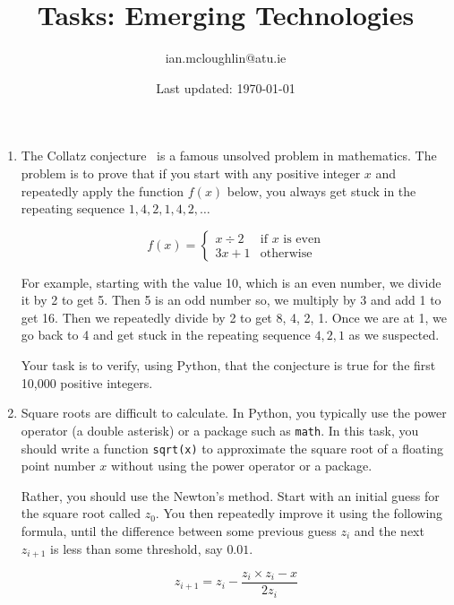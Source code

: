 \documentclass{iansnotes}
\title{Tasks: Emerging Technologies}
\author{ian.mcloughlin@atu.ie}
\date{Last updated: \today}
\begin{document}
 
\maketitle
 
\begin{enumerate}
  \item The Collatz conjecture~\autocite{quantacollatz} is a famous unsolved problem in mathematics. The problem is to prove that if you start with any positive integer $x$ and repeatedly apply the function $f(x)$ below, you always get stuck in the repeating sequence $1,4,2,1,4,2,\ldots$ 
  
  $$ f(x) = \begin{cases}
    x \div 2 & \text{if } x \text{ is even} \\
    3x + 1              & \text{otherwise} 
  \end{cases}$$

  For example, starting with the value 10, which is an even number, we divide it by 2 to get 5.
  Then 5 is an odd number so, we multiply by 3 and add 1 to get 16.
  Then we repeatedly divide by 2 to get 8, 4, 2, 1.
  Once we are at 1, we go back to 4 and get stuck in the repeating sequence $4, 2, 1$ as we suspected.

  Your task is to verify, using Python, that the conjecture is true for the first 10,000 positive integers.
  
  \item Square roots are difficult to calculate. In Python, you typically use the power operator (a double asterisk) or a package such as \texttt{math}. In this task\autocite{golangnewton}, you should write a function \texttt{sqrt(x)} to approximate the square root of a floating point number $x$ without using the power operator or a package.
  
  Rather, you should use the Newton's method\autocite{newtonsqrt}. Start with an initial guess for the square root called $z_0$. You then repeatedly improve it using the following formula, until the difference between some previous guess $z_i$ and the next $z_{i+1}$ is less than some threshold, say $0.01$.
  
  $$ z_{i+1} = z_i -  \frac{z_i \times z_i - x}{2 z_i}$$
\end{enumerate}
\end{document}
